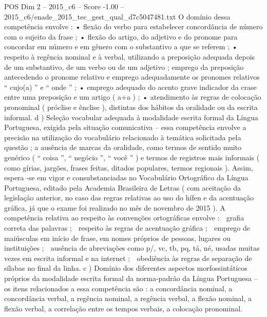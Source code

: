 \begin{textsample}{POS Dim 2 – 2015\_c6 – Score -1.00 – 2015\_c6/enade\_2015\_tec\_gest\_qual\_d7c5047481.txt}
O domínio dessa competência envolve : • flexão do verbo para estabelecer concordância de número com o sujeito da frase ; • flexão do artigo, do adjetivo e do pronome para concordar em número e em gênero com o substantivo a que se referem ; • respeito à regência nominal e à verbal, utilizando a preposição adequada depois de um substantivo, de um verbo ou de um adjetivo ; emprego da preposição antecedendo o pronome relativo e emprego adequadamente os pronomes relativos “ cujo(a) ” e “ onde ” ; • emprego adequado do acento grave indicador da crase entre uma preposição e um artigo ( a+a ) ; • atendimento às regras de colocação pronominal ( próclise e ênclise ), distintas dos hábitos da oralidade ou da escrita informal. d ) Seleção vocabular adequada à modalidade escrita formal da Língua Portuguesa, exigida pela situação comunicativa – essa competência envolve a precisão na utilização do vocabulário relacionado à temática solicitada pela questão ; a ausência de marcas da oralidade, como termos de sentido muito genérico ( “ coisa ”, “ negócio ”, “ você ” ) e termos de registros mais informais ( como gírias, jargões, frases feitas, ditados populares, termos regionais ).
Assim, espera -se em vigor e consubstanciadas no Vocabulário Ortográfico da Língua Portuguesa, editado pela Academia Brasileira de Letras ( com aceitação da legislação anterior, no caso das regras relativas ao uso do hífen e da acentuação gráfica, já que o exame foi realizado no mês de novembro de 2015 ).
A competência relativa ao respeito às convenções ortográficas envolve :  grafia correta das palavras ;  respeito às regras de acentuação gráfica ;  emprego de maiúsculas em início de frase, em nomes próprios de pessoas, lugares ou instituições ;  ausência de abreviações como p/, vc, tb, pq, tá, né, usadas muitas vezes em escrita informal e na internet ;  obediência às regras de separação de sílabas no final da linha. c ) Domínio dos diferentes aspectos morfossintáticos próprios da modalidade escrita formal da norma-padrão da Língua Portuguesa – os itens relacionados a essa competência são : a concordância nominal, a concordância verbal, a regência nominal, a regência verbal, a flexão nominal, a flexão verbal, a correlação entre os tempos verbais, a colocação pronominal.

\end{textsample}
